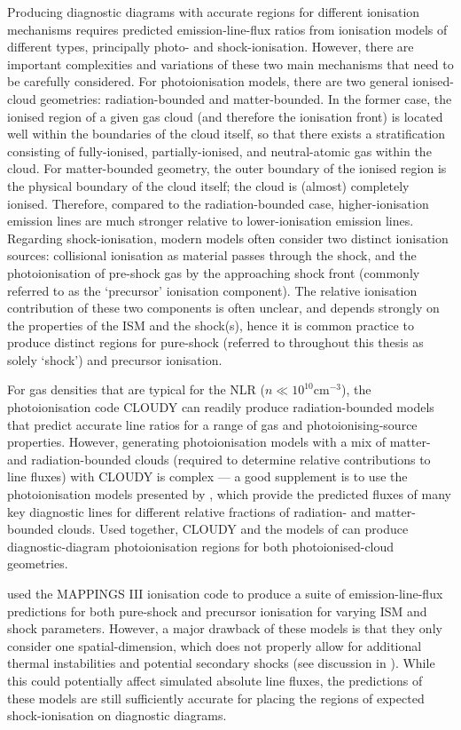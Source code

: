 Producing diagnostic diagrams with accurate regions for different ionisation mechanisms requires predicted emission-line-flux ratios from ionisation models of different types, principally photo- and shock-ionisation. However, there are important complexities and variations of these two main mechanisms that need to be carefully considered. For photoionisation models, there are two general ionised-cloud geometries: radiation-bounded and matter-bounded. In the former case, the ionised region of a given gas cloud (and therefore the ionisation front) is located well within the boundaries of the cloud itself, so that there exists a stratification consisting of fully-ionised, partially-ionised, and neutral-atomic gas within the cloud. For matter-bounded geometry, the outer boundary of the ionised region is the physical boundary of the cloud itself; the cloud is (almost) completely ionised. Therefore, compared to the radiation-bounded case, higher-ionisation emission lines are much stronger relative to lower-ionisation emission lines. Regarding shock-ionisation, modern models often consider two distinct ionisation sources: collisional ionisation as material passes through the shock, and the photoionisation of pre-shock gas by the approaching shock front (commonly referred to as the `precursor' ionisation component). The relative ionisation contribution of these two components is often unclear, and depends strongly on the properties of the ISM and the shock(s), hence it is common practice to produce distinct regions for pure-shock (referred to throughout this thesis as solely `shock') and precursor ionisation.

For gas densities that are typical for the NLR ($n\ll10^{10}$\;cm$^{-3}$), the photoionisation code \textsc{CLOUDY} \citep{Ferland2017} can readily produce radiation-bounded models that predict accurate line ratios for a range of gas and photoionising-source properties. However, generating photoionisation models with a mix of matter- and radiation-bounded clouds (required to determine relative contributions to line fluxes) with \textsc{CLOUDY} is complex --- a good supplement is to use the photoionisation models presented by \citet{Binette1996}, which provide the predicted fluxes of many key diagnostic lines for different relative fractions of radiation- and matter-bounded clouds. Used together, \textsc{CLOUDY} and the models of \citet{Binette1996} can produce diagnostic-diagram photoionisation regions for both photoionised-cloud geometries.

\citet{Allen2008} used the MAPPINGS III ionisation code to produce a suite of emission-line-flux predictions for both pure-shock and precursor ionisation for varying ISM and shock parameters. However, a major drawback of these models is that they only consider one spatial-dimension, which does not properly allow for additional thermal instabilities and potential secondary shocks (see discussion in \citealt{Allen2008}). While this could potentially affect simulated absolute line fluxes, the predictions of these models are still sufficiently accurate for placing the regions of expected shock-ionisation on diagnostic diagrams.

